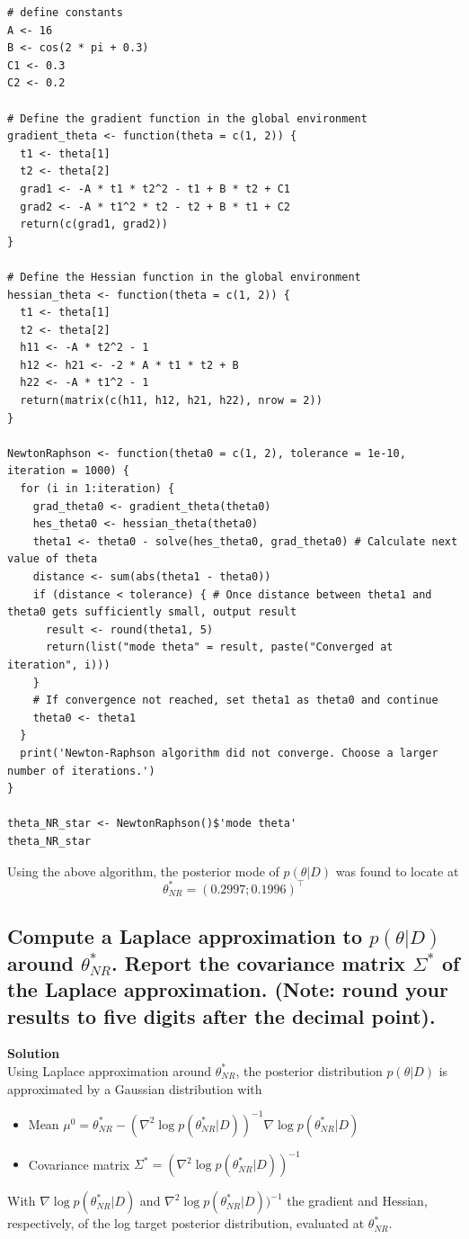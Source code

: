\documentclass[12pt]{article}
\begin{document}
\begin{lstlisting}
# define constants
A <- 16
B <- cos(2 * pi + 0.3)
C1 <- 0.3
C2 <- 0.2

# Define the gradient function in the global environment
gradient_theta <- function(theta = c(1, 2)) {
  t1 <- theta[1]
  t2 <- theta[2]
  grad1 <- -A * t1 * t2^2 - t1 + B * t2 + C1
  grad2 <- -A * t1^2 * t2 - t2 + B * t1 + C2
  return(c(grad1, grad2))
}

# Define the Hessian function in the global environment
hessian_theta <- function(theta = c(1, 2)) {
  t1 <- theta[1]
  t2 <- theta[2]
  h11 <- -A * t2^2 - 1
  h12 <- h21 <- -2 * A * t1 * t2 + B
  h22 <- -A * t1^2 - 1
  return(matrix(c(h11, h12, h21, h22), nrow = 2))
}

NewtonRaphson <- function(theta0 = c(1, 2), tolerance = 1e-10, iteration = 1000) {
  for (i in 1:iteration) {
    grad_theta0 <- gradient_theta(theta0)
    hes_theta0 <- hessian_theta(theta0)
    theta1 <- theta0 - solve(hes_theta0, grad_theta0) # Calculate next value of theta
    distance <- sum(abs(theta1 - theta0))
    if (distance < tolerance) { # Once distance between theta1 and theta0 gets sufficiently small, output result
      result <- round(theta1, 5)
      return(list("mode theta" = result, paste("Converged at iteration", i)))
    }
    # If convergence not reached, set theta1 as theta0 and continue
    theta0 <- theta1
  }
  print('Newton-Raphson algorithm did not converge. Choose a larger number of iterations.')
}

theta_NR_star <- NewtonRaphson()$'mode theta'
theta_NR_star

\end{lstlisting}
Using the above algorithm, the posterior mode of \( p(\theta|D) \) was found to locate at
\[ \theta^*_{NR} = (0.2997; 0.1996)^\top \]

\subsection{Compute a Laplace approximation to \( p(\theta|D) \) around \( \theta^*_{NR} \). Report the covariance matrix \( \Sigma^* \) of the Laplace approximation. (Note: round your results to five digits after the decimal point).}
\textbf{Solution}\\
Using Laplace approximation around \( \theta^*_{NR} \), the posterior distribution \( p(\theta|D) \) is approximated
by a Gaussian distribution with
\begin{itemize}
    \item Mean \( \mu^{0} = \theta^*_{NR} - (\nabla^2 \log p(\theta^*_{NR}|D))^{-1} \nabla \log p(\theta^*_{NR}|D) \)
    \item Covariance matrix \( \Sigma^* = (\nabla^2 \log p(\theta^*_{NR}|D))^{-1} \)
\end{itemize}
With \( \nabla \log p(\theta^*_{NR}|D) \) and \( \nabla^2 \log p(\theta^*_{NR}|D))^{-1} \) the gradient and Hessian, respectively, of the
log target posterior distribution, evaluated at \( \theta^*_{NR} \).
\end{document}
